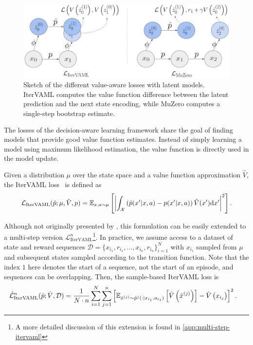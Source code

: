 \begin{figure}[t]
    \centering
    \includegraphics[width=.8\textwidth]{illustrations/lambda/loss_comparison_names.png}
    \caption{Sketch of the different value-aware losses with latent models. IterVAML computes the value function difference between the latent prediction and the next state encoding, while MuZero computes a single-step bootstrap estimate.}
    \label{fig:loss_graphic}
\end{figure}

The losses of the decision-aware learning framework share the goal of finding models that provide good value function estimates.
Instead of simply learning a model using maximum likelihood estimation, the value function is directly used in the model update. 

Given a distribution $\mu$ over the state space and a value function approximation $\hat{V}$, the IterVAML loss~\parencite{itervaml} is defined as
\begin{align}
    \mathcal{L}_\text{IterVAML}(\hat{p}; \mu, \hat{V}, p) = \mathbb{E}_{x, a \sim \mu}\left[  \left|\int_\mathcal{X} \left( \hat{p}(x'|x, a) - p(x'|x, a) \right) \hat{V}(x') \mathrm{d}x'\right|^2 \right].\label{eq:itervaml}
\end{align}

Although not originally presented by \cite{itervaml}, this formulation can be easily extended to a multi-step version $\mathcal{L}^n_\text{IterVAML}$\footnote{A more detailed discussion of this extension is found in \autoref{app:multi-step-itervaml}}.
In practice, we assume access to a dataset of state and reward sequences $\mathcal{D} = \{x_{i_1}, r_{i_1}, \dots, x_{i_n}, r_{i_n}\}_{i=1}^N$ with $x_{i_1}$ sampled from $\mu$ and subsequent states sampled according to the transition function.
Note that the index $1$ here denotes the start of a sequence, not the start of an episode, and sequences can be overlapping. 
Then, the sample-based IterVAML loss is \
\begin{align}
    \hat{\mathcal{L}}^n_\text{IterVAML}(\hat{p}; \hat{V}, \mathcal{D}) &= \frac{1}{N\cdot n}\sum_{i=1}^N \sum_{j=1}^n \left[ \mathbb{E}_{\hat{x}^{(j)}\sim \hat{p}^j(\cdot|x_{i_1}, a_{i_1})}\left[  \hat{V}\left( \hat{x}^{(j)} \right) \right] - \hat{V}\left( x_{i_j} \right)  \right]^2.
\end{align}

